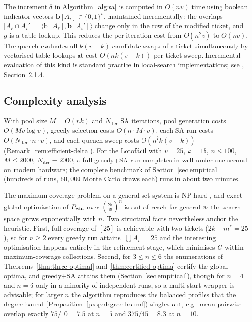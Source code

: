 \begin{remark}
  \label{rem:efficient-delta}
  The increment $\delta$ in Algorithm~\ref{alg:sa} is computed in $O(nv)$
  time using boolean indicator vectors $\bm{b}[A_i] \in \{0,1\}^v$,
  maintained incrementally: the overlaps $|A_\ell \cap A_i'| =
  \langle \bm{b}[A_\ell], \bm{b}[A_i']\rangle$ change only in the row of
  the modified ticket, and $g$ is a table lookup.  This reduces the
  per-iteration cost from $O(n^2 v)$ to $O(nv)$.  The quench evaluates all
  $k(v-k)$ candidate swaps of a ticket simultaneously by vectorised table
  lookups at cost $O(n k (v-k))$ per ticket sweep.  Incremental evaluation
  of this kind is standard practice in local-search implementations; see
  \citet{Talbi2009}, Section~2.1.4.
\end{remark}

\subsection{Complexity analysis}
\label{sec:algo-complexity}

\begin{proposition}
  \label{prop:complexity}
  With pool size $M = O(nk)$ and $N_\mathrm{iter}$ SA iterations, pool
  generation costs $O(Mv\log v)$, greedy selection costs
  $O(n \cdot M \cdot v)$, each SA run costs
  $O(N_\mathrm{iter} \cdot n \cdot v)$, and each quench sweep costs
  $O(n^2 k(v-k))$ (Remark~\ref{rem:efficient-delta}).  For the
  Lotof\'{a}cil with $v=25$, $k=15$, $n \le 100$, $M \le 2000$,
  $N_\mathrm{iter}=2000$, a full greedy+SA run completes in well under one
  second on modern hardware; the complete benchmark of
  Section~\ref{sec:empirical} (hundreds of runs, $50{,}000$ Monte Carlo
  draws each) runs in about two minutes.
\end{proposition}

\begin{remark}[On optimality]
  The maximum-coverage problem on a general set system is NP-hard
  \cite{Feige1998}, and exact global optimisation of $P_{\mathrm{win}}$ over
  $\binom{25}{15}^n$ is out of reach for general $n$: the search space
  grows exponentially with $n$.  Two structural facts nevertheless anchor
  the heuristic.  First, full coverage of $[25]$ is achievable with two
  tickets ($2k - m^* = 25$), so for $n \ge 2$ every greedy run attains
  $|\bigcup A_i| = 25$ and the interesting optimisation happens entirely in
  the refinement stage, which minimises $G$ within maximum-coverage
  collections.  Second, for $3 \le n \le 6$ the enumerations of
  Theorems~\ref{thm:three-optimal} and~\ref{thm:certified-optima} certify the
  global optima, and greedy+SA attains them
  (Section~\ref{sec:empirical}), though for $n = 4$ and $n = 6$ only in a
  minority of independent runs, so a multi-start wrapper is advisable;
  for larger $n$ the algorithm reproduces
  the balanced profiles that the degree bound
  (Proposition~\ref{prop:degree-bound}) singles out, e.g.\ mean pairwise
  overlap exactly $75/10 = 7.5$ at $n=5$ and $375/45 = 8.\overline{3}$ at
  $n=10$.
\end{remark}
